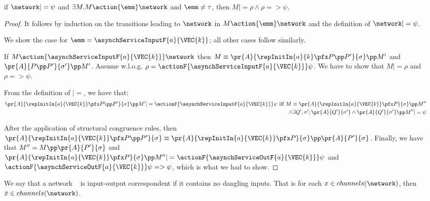 \begin{lemma}\label{Logic4Struct:lemma:LL:implication}
   if $\network |= \psi $ and $\exists M. M \action{\emm} \network$
   and $\emm \not = \tau$,
   then $M |= \rho \land \rho => \psi$.
\begin{proof}
It follows by induction on the transitions leading to $\network$ in $M \action{\emm}
\network$ and the definition of $\network  |= \psi$.

We show the case for $\emm = \asynchServiceInputF{a}{\VEC{k}}$; all other cases
follow similarly.

If $M \action{\asynchServiceInputF{a}{\VEC{k}}} \network$ then $M
\equiv \pr{A}{\repInitIn{a}{k} \pfx P \pp P'}{\sigma} \pp M'$ and
$\pr{A}{P \pp P'}{\sigma'} \pp M'$. Assume w.l.o.g. $\rho =
\actionF{\asynchServiceInputF{a}{\VEC{k}}} \psi$. We have to show that
$M |= \rho$ and $\rho => \psi$.

From the definition of $|=$, we have that:
\begin{align}
   \pr{A}{\repInitIn{a}{\VEC{k}} \pfx P \pp P'}{\sigma} \pp M' |=
   \actionF{\asynchServiceInputF{a}{\VEC{k}}} \psi \text{ iff } M \equiv
   \pr{A}{\repInitIn{a}{\VEC{k}} \pfx P}{\sigma} \pp M''  \notag\\
   \land \exists
   Q',\sigma'; \pr{A}{Q'}{\sigma'} \land \pr{A}{Q'}{\sigma'} \pp M''
   |= \psi 
\end{align}

After the application of structural congruence rules, then $\pr{A}{\repInitIn{a}{\VEC{k}}
  \pfx P \pp P'}{\sigma} \equiv \pr{A}{\repInitIn{a}{\VEC{k}}
  \pfx P }{\sigma} \pp \pr{A}{P'}{\sigma}$. Finally, we have that $M'' = M \pp
\pr{A}{P'}{\sigma}$ and $\pr{A}{\repInitIn{a}{\VEC{k}}
  \pfx P }{\sigma} \pp M'' |=
\actionF{\asynchServiceOutF{a}{\VEC{k}}} \psi$ and
$\actionF{\asynchServiceOutF{a}{\VEC{k}}} \psi => \psi$, which is what we
had to show.
\end{proof}
\end{lemma}



\begin{definition} \label{Logic4Struct:def:io-correspondence}
  We say that a network \network~ is input-output correspondent if
  it contains no dangling inputs. That is for each $x \in
  channels(\network)$, then $\bar{x} \in channels(\network)$.
\end{definition}

